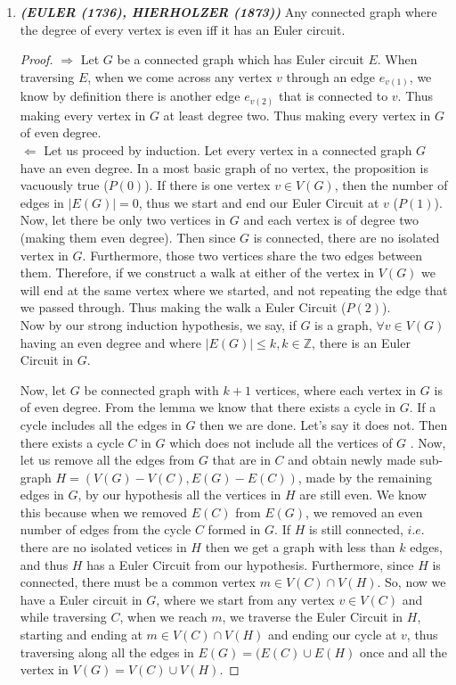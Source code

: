 \documentclass[12pt, fullpage]{article}
\newcommand{\Z}{\mathbb Z}
\begin{document}
\begin{enumerate}
	\item \textit{\textbf{(EULER (1736), HIERHOLZER (1873))}} Any connected graph where the degree of every vertex is even iff it has an Euler circuit.
\begin{proof}
 	$\Longrightarrow$ Let $G$ be a connected graph which has Euler circuit $E$. When traversing $E$, when we come across any vertex $v$ through an edge $e_{v(1)}$, we know by definition there is another edge $e_{v(2)}$ that is connected to $v$. Thus making every vertex in $G$ at least degree two. Thus making every vertex in $G$ of even degree. \\
 	
 	$\Longleftarrow$ Let us proceed by induction. Let every vertex in a connected graph $G$ have an even degree. In a most basic graph of no vertex, the proposition is vacuously true ($P(0)$). If there is one vertex $v \in V(G)$, then the number of edges in $|E(G)| = 0$, thus we start and end our Euler Circuit at $v$ ($P(1)$). Now, let there be only two vertices in $G$ and each vertex is of degree two (making them even degree). Then since $G$ is connected, there are no isolated vertex in $G$. Furthermore, those two vertices share the two edges between them. Therefore, if we construct a walk at either of the vertex in $V(G)$ we will end at the same vertex where we started, and not repeating the edge that we passed through. Thus making the walk a Euler Circuit ($P(2)$).\\ 
 	Now by our strong induction hypothesis, we say, if $G$ is a graph, $\forall v \in V(G)$ having an even degree and where $\vert E(G)\vert \leq k, k \in \Z$, there is an Euler Circuit in $G$.
 	
 	 Now, let $G$ be connected graph with $k+1$ vertices, where each vertex in $G$ is of even degree. From the lemma we know that there exists a cycle in $G$. If a cycle includes all the edges in $G$ then we are done. Let's say it does not. Then there exists a cycle $C$ in $G$ which does not include all the vertices of $G$ . Now, let us remove all the edges from $G$ that are in $C$ and obtain newly made sub-graph $H = (V(G) - V(C) , E(G)-E(C))$, made by the remaining edges in $G$, by our hypothesis all the vertices in $H$ are still even. We know this because when we removed $E(C)$ from $E(G)$, we removed an even number of edges from the cycle $C$ formed in $G$. If $H$ is still connected, $i.e.$ there are no isolated vetices in $H$ then we get a graph with less than $k$ edges, and thus $H$ has a Euler Circuit from our hypothesis. Furthermore, since $H$ is connected, there must be a common vertex $m \in V(C) \cap V(H)$. So, now we have a Euler circuit in $G$, where we start from any vertex $v \in V(C)$ and while traversing $C$, when we reach $m$, we traverse the Euler Circuit in $H$, starting and ending at $m \in V(C) \cap V(H)$ and ending our cycle at $v$, thus traversing along all the edges in $E(G) = (E(C) \cup E(H)$ once and all the vertex in $V(G) = V(C) \cup V(H)$.
 	 

\end{proof}
\end{enumerate}
\end{document}
